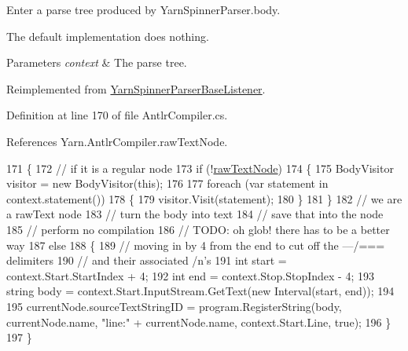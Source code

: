 Enter a parse tree produced by Yarn\-Spinner\-Parser.\-body. 

The default implementation does nothing.


\begin{DoxyParams}{Parameters}
{\em context} & The parse tree.\\
\hline
\end{DoxyParams}


Reimplemented from \hyperlink{a00196_a0bb84237855d76cd67c0214afeaece3c}{Yarn\-Spinner\-Parser\-Base\-Listener}.



Definition at line 170 of file Antlr\-Compiler.\-cs.



References Yarn.\-Antlr\-Compiler.\-raw\-Text\-Node.


\begin{DoxyCode}
171         \{
172             \textcolor{comment}{// if it is a regular node}
173             \textcolor{keywordflow}{if} (!\hyperlink{a00038_ac72e8a2a8207103d34b3d564e78fae93}{rawTextNode})
174             \{
175                 BodyVisitor visitor = \textcolor{keyword}{new} BodyVisitor(\textcolor{keyword}{this});
176 
177                 \textcolor{keywordflow}{foreach} (var statement \textcolor{keywordflow}{in} context.statement())
178                 \{
179                     visitor.Visit(statement);
180                 \}
181             \}
182             \textcolor{comment}{// we are a rawText node}
183             \textcolor{comment}{// turn the body into text}
184             \textcolor{comment}{// save that into the node}
185             \textcolor{comment}{// perform no compilation}
186             \textcolor{comment}{// TODO: oh glob! there has to be a better way}
187             \textcolor{keywordflow}{else}
188             \{
189                 \textcolor{comment}{// moving in by 4 from the end to cut off the ---/=== delimiters}
190                 \textcolor{comment}{// and their associated /n's}
191                 \textcolor{keywordtype}{int} start = context.Start.StartIndex + 4;
192                 \textcolor{keywordtype}{int} end = context.Stop.StopIndex - 4;
193                 \textcolor{keywordtype}{string} body = context.Start.InputStream.GetText(\textcolor{keyword}{new} Interval(start, end));
194 
195                 currentNode.sourceTextStringID = program.RegisterString(body, currentNode.name, \textcolor{stringliteral}{"line:"} + 
      currentNode.name, context.Start.Line, \textcolor{keyword}{true});
196             \}
197         \}
\end{DoxyCode}
